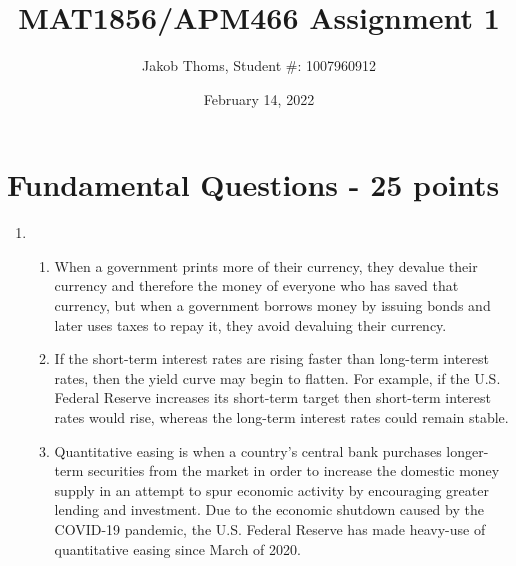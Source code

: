 \documentclass{article}
\title{MAT1856/APM466 Assignment 1}
\author{Jakob Thoms, Student \#: 1007960912}
\date{February 14, 2022}
\begin{document}
	\maketitle
	
	


	
	\section*{Fundamental Questions - 25 points}
	
	\begin{enumerate}
		\item \hfill
		\begin{enumerate}			
			\item When a government prints more of their currency, they devalue their currency and therefore the money of everyone who has saved that currency, but when a government borrows money by issuing bonds and later uses taxes to repay it, they avoid devaluing their currency.
			
			\item If the short-term interest rates are rising faster than long-term interest rates, then the yield curve may begin to flatten. For example, if the U.S. Federal Reserve increases its short-term target then short-term interest rates would rise, whereas the long-term interest rates could remain stable.

			
			\item Quantitative easing is when a country's central bank purchases longer-term securities from the market in order to increase the domestic money supply in an attempt to spur economic activity by encouraging greater lending and investment. Due to the economic shutdown caused by the COVID-19 pandemic, the U.S. Federal Reserve has made heavy-use of quantitative easing since March of 2020.
			

\end{enumerate}
\end{enumerate}
\end{document}
